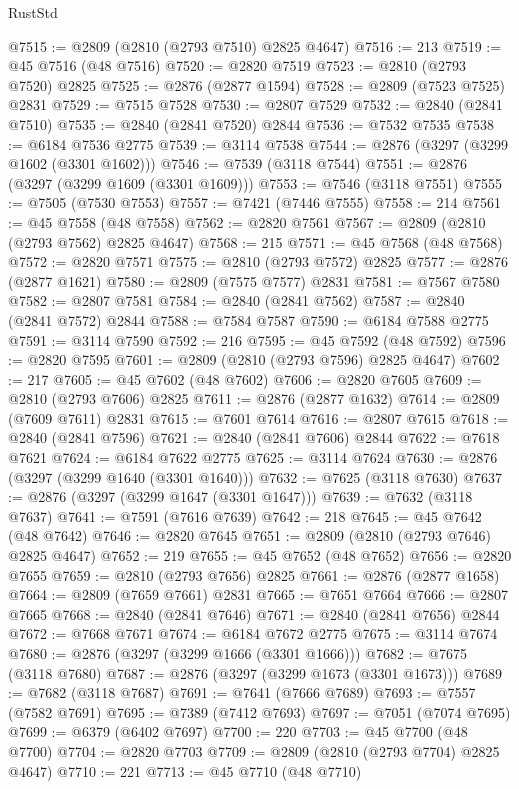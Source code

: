 \begin{lexlean}{RustStd}
\begin{coremodule}
{\begin{coremodule}
{{{{{{{{{{{{{{{{{{{{{{{{{{{{{{{{{@7515 := @2809 (@2810 (@2793 @7510) @2825 @4647)
@7516 := 213
@7519 := @45 @7516 (@48 @7516)
@7520 := @2820 @7519
@7523 := @2810 (@2793 @7520) @2825
@7525 := @2876 (@2877 @1594)
@7528 := @2809 (@7523 @7525) @2831
@7529 := @7515 @7528
@7530 := @2807 @7529
@7532 := @2840 (@2841 @7510)
@7535 := @2840 (@2841 @7520) @2844
@7536 := @7532 @7535
@7538 := @6184 @7536 @2775
@7539 := @3114 @7538
@7544 := @2876 (@3297 (@3299 @1602 (@3301 @1602)))
@7546 := @7539 (@3118 @7544)
@7551 := @2876 (@3297 (@3299 @1609 (@3301 @1609)))
@7553 := @7546 (@3118 @7551)
@7555 := @7505 (@7530 @7553)
@7557 := @7421 (@7446 @7555)
@7558 := 214
@7561 := @45 @7558 (@48 @7558)
@7562 := @2820 @7561
@7567 := @2809 (@2810 (@2793 @7562) @2825 @4647)
@7568 := 215
@7571 := @45 @7568 (@48 @7568)
@7572 := @2820 @7571
@7575 := @2810 (@2793 @7572) @2825
@7577 := @2876 (@2877 @1621)
@7580 := @2809 (@7575 @7577) @2831
@7581 := @7567 @7580
@7582 := @2807 @7581
@7584 := @2840 (@2841 @7562)
@7587 := @2840 (@2841 @7572) @2844
@7588 := @7584 @7587
@7590 := @6184 @7588 @2775
@7591 := @3114 @7590
@7592 := 216
@7595 := @45 @7592 (@48 @7592)
@7596 := @2820 @7595
@7601 := @2809 (@2810 (@2793 @7596) @2825 @4647)
@7602 := 217
@7605 := @45 @7602 (@48 @7602)
@7606 := @2820 @7605
@7609 := @2810 (@2793 @7606) @2825
@7611 := @2876 (@2877 @1632)
@7614 := @2809 (@7609 @7611) @2831
@7615 := @7601 @7614
@7616 := @2807 @7615
@7618 := @2840 (@2841 @7596)
@7621 := @2840 (@2841 @7606) @2844
@7622 := @7618 @7621
@7624 := @6184 @7622 @2775
@7625 := @3114 @7624
@7630 := @2876 (@3297 (@3299 @1640 (@3301 @1640)))
@7632 := @7625 (@3118 @7630)
@7637 := @2876 (@3297 (@3299 @1647 (@3301 @1647)))
@7639 := @7632 (@3118 @7637)
@7641 := @7591 (@7616 @7639)
@7642 := 218
@7645 := @45 @7642 (@48 @7642)
@7646 := @2820 @7645
@7651 := @2809 (@2810 (@2793 @7646) @2825 @4647)
@7652 := 219
@7655 := @45 @7652 (@48 @7652)
@7656 := @2820 @7655
@7659 := @2810 (@2793 @7656) @2825
@7661 := @2876 (@2877 @1658)
@7664 := @2809 (@7659 @7661) @2831
@7665 := @7651 @7664
@7666 := @2807 @7665
@7668 := @2840 (@2841 @7646)
@7671 := @2840 (@2841 @7656) @2844
@7672 := @7668 @7671
@7674 := @6184 @7672 @2775
@7675 := @3114 @7674
@7680 := @2876 (@3297 (@3299 @1666 (@3301 @1666)))
@7682 := @7675 (@3118 @7680)
@7687 := @2876 (@3297 (@3299 @1673 (@3301 @1673)))
@7689 := @7682 (@3118 @7687)
@7691 := @7641 (@7666 @7689)
@7693 := @7557 (@7582 @7691)
@7695 := @7389 (@7412 @7693)
@7697 := @7051 (@7074 @7695)
@7699 := @6379 (@6402 @7697)
@7700 := 220
@7703 := @45 @7700 (@48 @7700)
@7704 := @2820 @7703
@7709 := @2809 (@2810 (@2793 @7704) @2825 @4647)
@7710 := 221
@7713 := @45 @7710 (@48 @7710)
}}}}}}}}}}}}}}}}}}}}}}}}}}}}}}}}}
\end{coremodule}}
\end{coremodule}
\end{lexlean}
